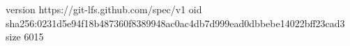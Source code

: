 version https://git-lfs.github.com/spec/v1
oid sha256:0231d5e94f18b487360f8389948ac0ac4db7d999ead0dbbebe14022bff23cad3
size 6015

